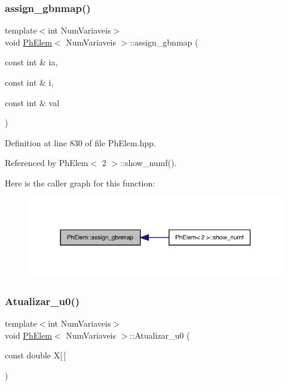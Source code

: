 \subsubsection{\texorpdfstring{assign\+\_\+gbnmap()}{assign\_gbnmap()}}
{\footnotesize\ttfamily template$<$int Num\+Variaveis$>$ \\
void \hyperlink{classPhElem}{Ph\+Elem}$<$ Num\+Variaveis $>$\+::assign\+\_\+gbnmap (\begin{DoxyParamCaption}\item[{const int \&}]{ia,  }\item[{const int \&}]{i,  }\item[{const int \&}]{val }\end{DoxyParamCaption})}



Definition at line 830 of file Ph\+Elem.\+hpp.



Referenced by Ph\+Elem$<$ 2 $>$\+::show\+\_\+numf().

Here is the caller graph for this function\+:
\nopagebreak
\begin{figure}[H]
\begin{center}
\leavevmode
\includegraphics[width=318pt]{classPhElem_ac6ea940519c924130a4cb44bbab2a31d_icgraph}
\end{center}
\end{figure}
\mbox{\label{classPhElem_aa3697427ea1b5024f52b98bcbcbb55f1}} 
\subsubsection{\texorpdfstring{Atualizar\+\_\+u0()}{Atualizar\_u0()}}
{\footnotesize\ttfamily template$<$int Num\+Variaveis$>$ \\
void \hyperlink{classPhElem}{Ph\+Elem}$<$ Num\+Variaveis $>$\+::Atualizar\+\_\+u0 (\begin{DoxyParamCaption}\item[{const double}]{X\mbox{[}$\,$\mbox{]} }\end{DoxyParamCaption})}



